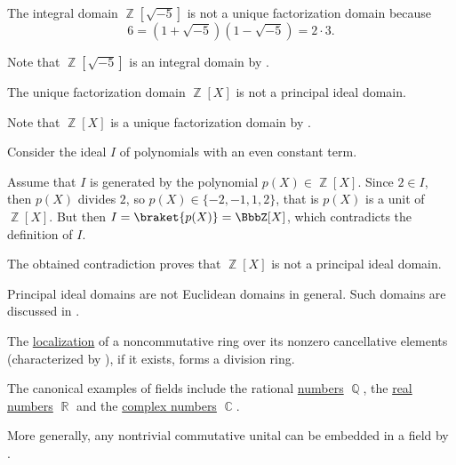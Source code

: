 \begin{example}
\begin{refenum}
    \cite[388]{Knapp2016BasicAlgebra} The integral domain \( \BbbZ[\sqrt{-5}] \) is not a unique factorization domain because
    \begin{equation*}
      6 = (1 + \sqrt{-5}) (1 - \sqrt{-5}) = 2 \cdot 3.
    \end{equation*}

    Note that \( \BbbZ[\sqrt{-5}] \) is an integral domain by .

    \cite{ProofWiki:polynomials_in_integers_is_not_principal_ideal_domain} The unique factorization domain \( \BbbZ[X] \) is not a principal ideal domain.

    Note that \( \BbbZ[X] \) is a unique factorization domain by .

    Consider the ideal \( I \) of polynomials with an even constant term.

    Assume that \( I \) is generated by the polynomial \( p(X) \in \BbbZ[X] \). Since \( 2 \in I \), then \( p(X) \) divides \( 2 \), so \( p(X) \in \{ -2, -1, 1, 2 \} \), that is \( p(X) \) is a unit of \( \BbbZ[X] \). But then \( I = \braket{p(X)} = \BbbZ[X] \), which contradicts the definition of \( I \).

    The obtained contradiction proves that \( \BbbZ[X] \) is not a principal ideal domain.

     Principal ideal domains are not Euclidean domains in general. Such domains are discussed in \cite{Anderson1988}.

     The \hyperref[def:ring_localization]{localization} of a noncommutative ring over its nonzero cancellative elements (characterized by ), if it exists, forms a division ring.

     The canonical examples of fields include the rational \hyperref[def:set_of_rational_numbers]{numbers} \( \BbbQ \), the \hyperref[def:set_of_real_numbers]{real numbers} \( \BbbR \) and the \hyperref[def:set_of_complex_numbers]{complex numbers} \( \BbbC \).

    More generally, any nontrivial commutative unital can be embedded in a field by .
  \end{refenum}
\end{example}


